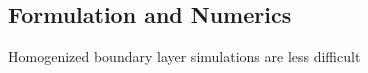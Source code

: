 \documentclass[mathserif]{beamer}
\begin{document}
\subsection{Formulation and Numerics}

\begin{frame}{Homogenized boundary layer simulations are less difficult}
\vspace{1em}
\begin{columns}[c,onlytextwidth]
  \begin{column}{0.50\linewidth}
    \centering
  \end{column}
  \begin{column}{0.23\linewidth}
    \centering
  \end{column}
  \begin{column}{0.20\linewidth}

\end{column}
\end{columns}
\end{frame}
\end{document}
